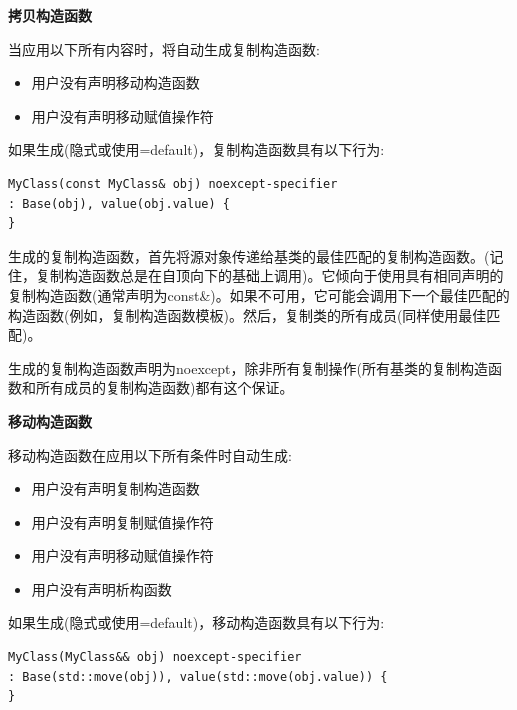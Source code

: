 \hspace*{\fill} \par %
\textbf{拷贝构造函数}

当应用以下所有内容时，将自动生成复制构造函数:\par

\begin{itemize}
	\item 用户没有声明移动构造函数
	\item 用户没有声明移动赋值操作符
\end{itemize}

如果生成(隐式或使用=default)，复制构造函数具有以下行为:\par

\begin{lstlisting}[caption={}]
MyClass(const MyClass& obj) noexcept-specifier
: Base(obj), value(obj.value) {
}
\end{lstlisting}

生成的复制构造函数，首先将源对象传递给基类的最佳匹配的复制构造函数。(记住，复制构造函数总是在自顶向下的基础上调用)。它倾向于使用具有相同声明的复制构造函数(通常声明为const\&)。如果不可用，它可能会调用下一个最佳匹配的构造函数(例如，复制构造函数模板)。然后，复制类的所有成员(同样使用最佳匹配)。\par

生成的复制构造函数声明为noexcept，除非所有复制操作(所有基类的复制构造函数和所有成员的复制构造函数)都有这个保证。\par

\hspace*{\fill} \par %
\textbf{移动构造函数}

移动构造函数在应用以下所有条件时自动生成:\par

\begin{itemize}
	\item 用户没有声明复制构造函数
	\item 用户没有声明复制赋值操作符
	\item 用户没有声明移动赋值操作符
	\item 用户没有声明析构函数
\end{itemize}

如果生成(隐式或使用=default)，移动构造函数具有以下行为:\par

\begin{lstlisting}[caption={}]
MyClass(MyClass&& obj) noexcept-specifier
: Base(std::move(obj)), value(std::move(obj.value)) {
}
\end{lstlisting}

